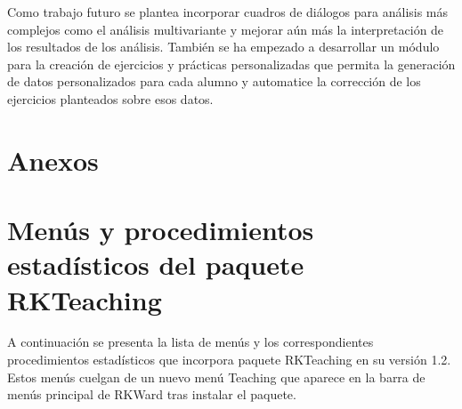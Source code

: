 \documentclass[10pt,twoside,spanish]{article}
\numberwithin{equation}{section}
\begin{document}
Como trabajo futuro se plantea incorporar cuadros de diálogos para análisis más complejos como el análisis multivariante y mejorar aún más
la interpretación de los resultados de los análisis. 
También se ha empezado a desarrollar un módulo para la creación de ejercicios y prácticas personalizadas que permita la generación de datos
personalizados para cada alumno y automatice la corrección de los ejercicios planteados sobre esos datos. 

\appendix
\section*{Anexos}

\section{Menús y procedimientos estadísticos del paquete RKTeaching}\label{menus_rkteaching}
A continuación se presenta la lista de menús y los correspondientes procedimientos estadísticos que incorpora paquete RKTeaching en su
versión 1.2.
Estos menús cuelgan de un nuevo menú \textsf{Teaching} que aparece en la barra de menús principal de RKWard tras instalar el paquete.

\newcommand\litem[1]{\item{\sffamily\bfseries #1 \enspace}}
\end{document}
